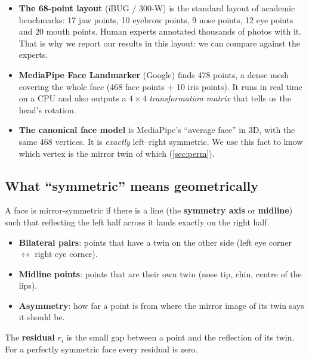 \begin{itemize}
\item \textbf{The 68-point layout} (iBUG / 300-W) is the standard layout of academic
benchmarks: 17 jaw points, 10 eyebrow points, 9 nose points, 12 eye points and 20 mouth
points. Human experts annotated thousands of photos with it. That is why we report our
results in this layout: we can compare against the experts.
\item \textbf{MediaPipe Face Landmarker} (Google) finds 478 points, a dense mesh covering the
whole face (468 face points + 10 iris points). It runs in real time on a CPU and also outputs
a $4\times4$ \emph{transformation matrix} that tells us the head's rotation.
\item \textbf{The canonical face model} is MediaPipe's ``average face'' in 3D, with the same 468
vertices. It is \emph{exactly} left--right symmetric. We use this fact to know which vertex
is the mirror twin of which (\cref{sec:perm}).
\end{itemize}

\subsection{What ``symmetric'' means geometrically}
A face is mirror-symmetric if there is a line (the \textbf{symmetry axis} or \textbf{midline})
such that reflecting the left half across it lands exactly on the right half.
\begin{itemize}
\item \textbf{Bilateral pairs}: points that have a twin on the other side (left eye
corner $\leftrightarrow$ right eye corner).
\item \textbf{Midline points}: points that are their own twin (nose tip, chin, centre of the lips).
\item \textbf{Asymmetry}: how far a point is from where the mirror image of its twin says it
should be.
\end{itemize}

\begin{center}
\end{center}
The \textbf{residual} $r_i$ is the small gap between a point and the reflection of its twin.
For a perfectly symmetric face every residual is zero.


